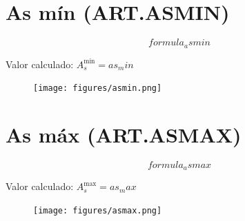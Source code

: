 \documentclass[12pt]{article}
\begin{document}
\vspace{0.5cm}

\section*{As m\'in (ART.ASMIN)}

\[
{{ formula_asmin }}
\]

Valor calculado: \( A_{s}^{\text{min}} = {{ as_min }} \)

\begin{figure}[H]
\centering
\texttt{[image: figures/asmin.png]}
\end{figure}

\vspace{0.5cm}

\section*{As m\'ax (ART.ASMAX)}

\[
{{ formula_asmax }}
\]

Valor calculado: \( A_{s}^{\text{max}} = {{ as_max }} \)

\begin{figure}[H]
\centering
\texttt{[image: figures/asmax.png]}
\end{figure}
\end{document}
